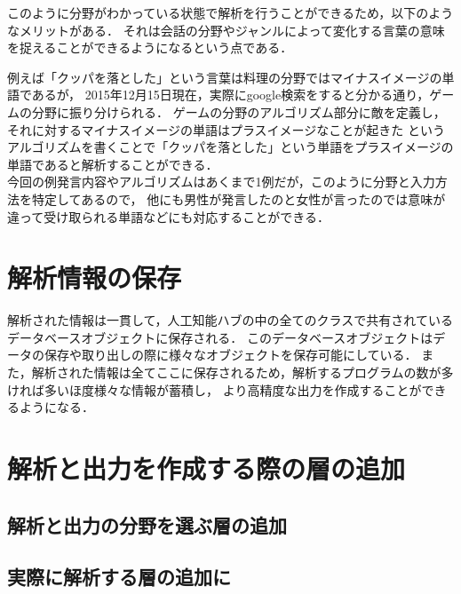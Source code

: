 このように分野がわかっている状態で解析を行うことができるため，以下のようなメリットがある．
それは会話の分野やジャンルによって変化する言葉の意味を捉えることができるようになるという点である．

例えば「クッパを落とした」という言葉は料理の分野ではマイナスイメージの単語であるが，
2015年12月15日現在，実際にgoogle検索をすると分かる通り，ゲームの分野に振り分けられる．
ゲームの分野のアルゴリズム部分に敵を定義し，それに対するマイナスイメージの単語はプラスイメージなことが起きた
というアルゴリズムを書くことで「クッパを落とした」という単語をプラスイメージの単語であると解析することができる．
\\
今回の例発言内容やアルゴリズムはあくまで1例だが，このように分野と入力方法を特定してあるので，
他にも男性が発言したのと女性が言ったのでは意味が違って受け取られる単語などにも対応することができる．
\section{解析情報の保存}
解析された情報は一貫して，人工知能ハブの中の全てのクラスで共有されているデータベースオブジェクトに保存される．
このデータベースオブジェクトはデータの保存や取り出しの際に様々なオブジェクトを保存可能にしている．
また，解析された情報は全てここに保存されるため，解析するプログラムの数が多ければ多いほ度様々な情報が蓄積し，
より高精度な出力を作成することができるようになる．


\section{解析と出力を作成する際の層の追加}

\subsection{解析と出力の分野を選ぶ層の追加}
\subsection{実際に解析する層の追加に}
